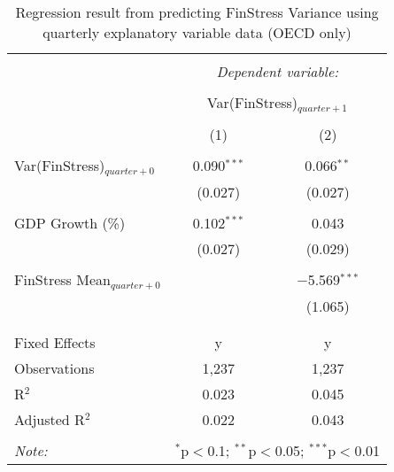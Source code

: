 
\begin{table}[!htbp] \centering 
  \caption{Regression result from predicting FinStress Variance using quarterly explanatory variable data (OECD only)} 
  \label{quarterly_reg} 
\small 
\begin{tabular}{@{\extracolsep{5pt}}lcc} 
\\[-1.8ex]\hline 
\hline \\[-1.8ex] 
 & \multicolumn{2}{c}{\textit{Dependent variable:}} \\ 
\cline{2-3} 
\\[-1.8ex] & \multicolumn{2}{c}{Var(FinStress)$_{quarter+1}$} \\ 
\\[-1.8ex] & (1) & (2)\\ 
\hline \\[-1.8ex] 
 Var(FinStress)$_{quarter + 0}$ & 0.090$^{***}$ & 0.066$^{**}$ \\ 
  & (0.027) & (0.027) \\ 
  & & \\ 
 GDP Growth (\%) & 0.102$^{***}$ & 0.043 \\ 
  & (0.027) & (0.029) \\ 
  & & \\ 
 FinStress Mean$_{quarter + 0}$ &  & $-$5.569$^{***}$ \\ 
  &  & (1.065) \\ 
  & & \\ 
\hline \\[-1.8ex] 
Fixed Effects & y & y \\ 
Observations & 1,237 & 1,237 \\ 
R$^{2}$ & 0.023 & 0.045 \\ 
Adjusted R$^{2}$ & 0.022 & 0.043 \\ 
\hline 
\hline \\[-1.8ex] 
\textit{Note:}  & \multicolumn{2}{r}{$^{*}$p$<$0.1; $^{**}$p$<$0.05; $^{***}$p$<$0.01} \\ 
\end{tabular} 
\end{table} 
